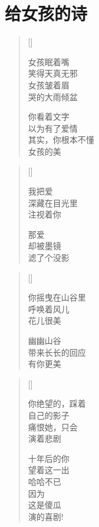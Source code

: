 \chapter{给女孩的诗}
\thispagestyle{empty}
\renewcommand{\poemtoc}{subsection}
\settowidth{\versewidth}{女孩眠着嘴}
\begin{verse}[\versewidth]

女孩眠着嘴\\
笑得天真无邪\\
女孩皱着眉\\
哭的大雨倾盆

你看着文字\\
以为有了爱情\\
其实，你根本不懂\\
女孩的美
\end{verse}

\settowidth{\versewidth}{女孩眠着嘴}
\begin{verse}[\versewidth]

我把爱\\
深藏在目光里\\
注视着你

那爱\\
却被墨镜\\
滤了个没影
\end{verse}

\settowidth{\versewidth}{女孩眠着嘴}
\begin{verse}[\versewidth]

你摇曳在山谷里\\
呼唤着风儿\\
花儿很美

幽幽山谷\\
带来长长的回应\\
有你更美
\end{verse}
\newpage

\settowidth{\versewidth}{你绝望的，踩着}
\begin{verse}[\versewidth]

你绝望的，踩着\\
自己的影子\\
痛恨她，只会\\
演着悲剧

十年后的你\\
望着这一出\\
哈哈不已\\
因为\\
这是傻瓜\\
演的喜剧!
\end{verse}

